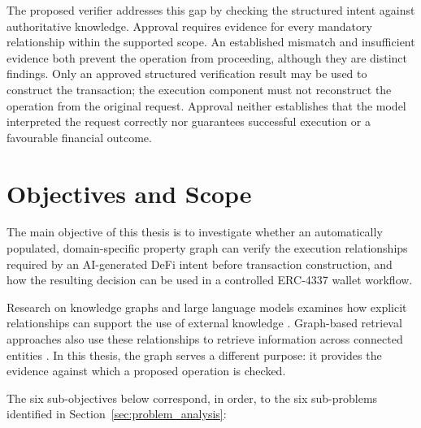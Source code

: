 The proposed verifier addresses this gap by checking the structured intent
against authoritative knowledge. Approval requires evidence for every
mandatory relationship within the supported scope. An established
mismatch and insufficient evidence both prevent the operation from
proceeding, although they are distinct findings. Only an approved
structured verification result may be used to construct the transaction;
the execution component must not reconstruct the operation from the
original request. Approval neither establishes that the model interpreted
the request correctly nor guarantees successful execution or a favourable
financial outcome.


\section{Objectives and Scope}
\label{sec:objectives_scope}

The main objective of this thesis is to investigate whether an
automatically populated, domain-specific property graph can verify the
execution relationships required by an AI-generated DeFi intent before
transaction construction, and how the resulting decision can be used
in a controlled ERC-4337 wallet workflow.

Research on knowledge graphs and large language models examines how
explicit relationships can support the use of external knowledge
\cite{panUnifyingLargeLanguage2024}. Graph-based retrieval approaches
also use these relationships to retrieve information across connected
entities \cite{hanRetrievalAugmentedGenerationGraphs2025,
hanRAGVsGraphRAG2026}. In this thesis, the graph serves a different
purpose: it provides the evidence against which a proposed operation
is checked.

The six sub-objectives below correspond, in order, to the six
sub-problems identified in Section~\ref{sec:problem_analysis}:

